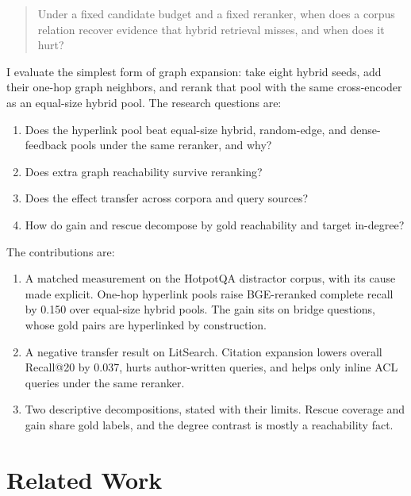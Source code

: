 \documentclass[10pt,twocolumn]{article}
\begin{document}
\begin{quote}
Under a fixed candidate budget and a fixed reranker, when does a corpus relation
recover evidence that hybrid retrieval misses, and when does it hurt?
\end{quote}

I evaluate the simplest form of graph expansion: take eight hybrid seeds, add
their one-hop graph neighbors, and rerank that pool with the same
cross-encoder as an equal-size hybrid pool. The research questions are:

\begin{enumerate}[label=\textbf{RQ\arabic*}]
  \item Does the hyperlink pool beat equal-size hybrid, random-edge, and
    dense-feedback pools under the same reranker, and why?
  \item Does extra graph reachability survive reranking?
  \item Does the effect transfer across corpora and query sources?
  \item How do gain and rescue decompose by gold reachability and target
    in-degree?
\end{enumerate}

The contributions are:
\begin{enumerate}
  \item A matched measurement on the HotpotQA distractor corpus, with its
    cause made explicit. One-hop hyperlink pools raise BGE-reranked complete
    recall by 0.150 over equal-size hybrid pools. The gain sits on bridge
    questions, whose gold pairs are hyperlinked by construction.
  \item A negative transfer result on LitSearch. Citation expansion lowers
    overall Recall@20 by 0.037, hurts author-written queries, and helps only
    inline ACL queries under the same reranker.
  \item Two descriptive decompositions, stated with their limits. Rescue
    coverage and gain share gold labels, and the degree contrast is mostly a
    reachability fact.
\end{enumerate}

\section{Related Work}
\end{document}
